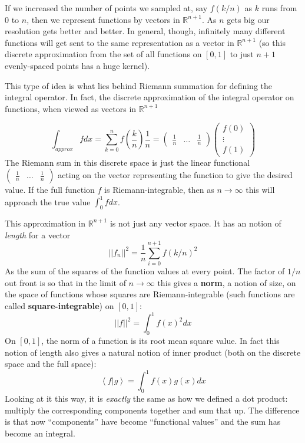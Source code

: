 	If we increased the number of points we sampled at, say $f(k/n)$ as $k$ runs from $0$ to $n$, then we represent functions by vectors in $\mathbb{R}^{n+1}$. As $n$ gets big our resolution gets better and better. In general, though, infinitely many different functions will get sent to the same representation as a vector in $\mathbb{R}^{n+1}$ (so this discrete approximation from the set of all functions on $[0,1]$ to just $n+1$ evenly-spaced points has a huge kernel).
	
	This type of idea is what lies behind Riemann summation for defining the integral operator. In fact, the discrete approximation of the integral operator on functions, when viewed as vectors in $\mathbb{R}^{n+1}$
	\begin{example}
	\end{example}
	\begin{equation*}
		\int_{approx} f dx = \sum_{k=0}^n f\left(\frac{k}{n}\right) \frac{1}{n} = 
		\begin{pmatrix}
			\frac{1}{n} & \dots & \frac{1}{n}
		\end{pmatrix}
		\begin{pmatrix}
			f(0) \\
			\vdots \\
			f(1)
		\end{pmatrix}
	\end{equation*}
	The Riemann sum in this discrete space is just the linear functional $\begin{pmatrix}
			\frac{1}{n} & \dots & \frac{1}{n}
		\end{pmatrix}$ acting on the vector representing the function to give the desired value. If the full function $f$ is Riemann-integrable, then as $n\rightarrow \infty$  this will approach the true value $\int_0^1 f dx$. 
		
	This approximation in $\mathbb R^{n+1}$ is not just any vector space. It has an notion of \emph{length} for a vector
	\begin{equation}
		||f_n||^2 = \frac{1}{n} \sum_{i=0}^{n+1} f(k/n)^2 
	\end{equation}
	As the sum of the squares of the function values at every point. The factor of $1/n$ out front is so that in the limit of $n\rightarrow \infty$ this gives a \textbf{norm}, a notion of size, on the space of functions whose squares are Riemann-integrable (such functions are called \textbf{square-integrable}) on $[0,1]$: 
	\begin{equation}
		||f||^2 = \int_{0}^1 f(x)^2 dx
	\end{equation}
	On $[0,1]$, the norm of a function is its root mean square value. In fact this notion of length also gives a natural notion of inner product (both on the discrete space and the full space):
	\begin{equation}
		\left< f | g \right> = \int_{0}^1 f(x) g(x) dx
	\end{equation}
	Looking at it this way, it is \emph{exactly} the same as how we defined a dot product: multiply the corresponding components together and sum that up. The difference is that now ``components'' have become ``functional values'' and the sum has become an integral.
	
